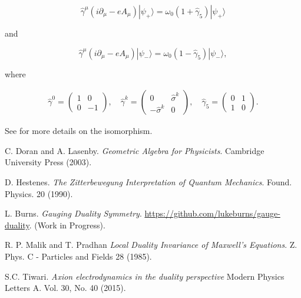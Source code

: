 \documentclass{article}
\begin{document}
  \begin{equation}
    \hat \gamma^\mu (i \partial_\mu - e A_\mu) | \psi_+ \rangle = \omega_0 (1 + \hat \gamma_5) | \psi_+ \rangle
  \end{equation}

  and

  \begin{equation}
    \hat \gamma^\mu (i \partial_\mu - e A_\mu) | \psi_- \rangle = \omega_0 (1 - \hat \gamma_5) | \psi_- \rangle,
  \end{equation}

  where

  \begin{align}
    \hat \gamma^0 = \begin{pmatrix} 1 & 0 \\ 0 & -1 \end{pmatrix},\quad \hat \gamma^k = \begin{pmatrix} 0 & \hat \sigma^k \\ -\hat \sigma^k & 0 \end{pmatrix},\quad \hat \gamma_5 = \begin{pmatrix} 0 & 1 \\ 1 & 0 \end{pmatrix}.
  \end{align}

  See \cite{gap} for more details on the isomorphism.

  \begin{thebibliography}{9}
      C. Doran and A. Lasenby.
      \emph{Geometric Algebra for Physicists}. Cambridge University Press (2003).

      D. Hestenes.
      \emph{The Zitterbewegung Interpretation of Quantum Mechanics}.
      Found. Physics. 20 (1990).

      L. Burns.
      \emph{Gauging Duality Symmetry}.
      \url{https://github.com/lukeburns/gauge-duality}. (Work in Progress).

      R. P. Malik and T. Pradhan 
      \emph{Local Duality Invariance of Maxwell's Equations}.
      Z. Phys. C - Particles and Fields 28 (1985).

      S.C. Tiwari.
      \emph{Axion electrodynamics in the duality perspective}
      Modern Physics Letters A.
      Vol. 30, No. 40 (2015).

  \end{thebibliography}
\end{document}
